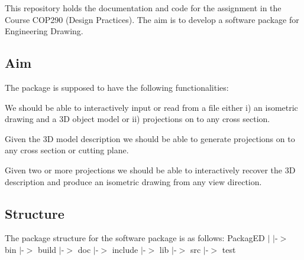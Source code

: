 This repository holds the documentation and code for the assignment in the Course C\+O\+P290 (Design Practices). The aim is to develop a software package for Engineering Drawing.

\subsection*{Aim}

The package is supposed to have the following functionalities\+:
\begin{DoxyEnumerate}
\item We should be able to interactively input or read from a file either i) an isometric drawing and a 3D object model or ii) projections on to any cross section.
\item Given the 3D model description we should be able to generate projections on to any cross section or cutting plane.
\item Given two or more projections we should be able to interactively recover the 3D description and produce an isometric drawing from any view direction.
\end{DoxyEnumerate}

\subsection*{Structure}

The package structure for the software package is as follows\+: Packag\+ED $\vert$ $\vert$-\/$>$ bin $\vert$-\/$>$ build $\vert$-\/$>$ doc $\vert$-\/$>$ include $\vert$-\/$>$ lib $\vert$-\/$>$ src $\vert$-\/$>$ test

